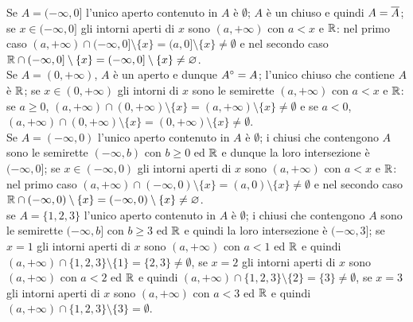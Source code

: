 Se $ A = (-\infty, 0] $ l'unico aperto contenuto in $ A $ è $ \emptyset $; $ A $ è un chiuso e quindi $ A = \overline{A} $; se $ x \in (-\infty, 0] $ gli intorni aperti di $ x $ sono $ (a, +\infty) $ con $ a < x $ e $ \mathbb{R} $: nel primo caso $ (a, +\infty) \cap (-\infty, 0] \setminus \{x\} = (a, 0] \setminus \{x\} \neq \emptyset $ e nel secondo caso $ \mathbb{R} \cap (-\infty, 0] \setminus \{x\} = (-\infty, 0] \setminus \{x\} \neq \varnothing $. \\
Se $ A = (0, +\infty) $, $ A $ è un aperto e dunque $ {A}^{\circ} = A $; l'unico chiuso che contiene $ A $ è $ \mathbb{R} $; se $ x \in (0, +\infty) $ gli intorni di $ x $ sono le semirette $ (a, +\infty) $ con $ a < x $ e $ \mathbb{R} $: se $ a \geq 0 $, $ (a, +\infty) \cap (0, +\infty) \setminus \{x\} = (a, +\infty) \setminus \{x\} \neq \emptyset $ e se $ a < 0 $, $ (a, +\infty) \cap (0, +\infty) \setminus \{x\} = (0, +\infty) \setminus \{x\} \neq \emptyset $. \\
Se $ A = (-\infty, 0) $ l'unico aperto contenuto in $ A $ è $ \emptyset $; i chiusi che contengono $ A $ sono le semirette $ (-\infty, b) $ con $ b \geq 0 $ ed $ \mathbb{R} $ e dunque la loro intersezione è $ (-\infty, 0] $; se $ x \in (-\infty, 0) $ gli intorni aperti di $ x $ sono $ (a, +\infty) $ con $ a < x $ e $ \mathbb{R} $: nel primo caso $ (a, +\infty) \cap (-\infty, 0) \setminus \{x\} = (a, 0) \setminus \{x\} \neq \emptyset $ e nel secondo caso $ \mathbb{R} \cap (-\infty, 0) \setminus \{x\} = (-\infty, 0) \setminus \{x\} \neq \varnothing $. \\
se $ A = \{1, 2, 3\} $ l'unico aperto contenuto in $ A $ è $ \emptyset $; i chiusi che contengono $ A $ sono le semirette $ (-\infty, b] $ con $ b \geq 3 $ ed $ \mathbb{R} $ e quindi la loro intersezione è $ (-\infty, 3] $; se $ x = 1 $ gli intorni aperti di $ x $ sono $ (a, +\infty) $ con $ a < 1 $ ed $ \mathbb{R} $ e quindi $ (a, +\infty) \cap \{1, 2, 3\} \setminus \{1\} = \{2, 3\} \neq \emptyset $, se $ x = 2 $ gli intorni aperti di $ x $ sono $ (a, +\infty) $ con $ a < 2 $ ed $ \mathbb{R} $ e quindi $ (a, +\infty) \cap \{1, 2, 3\} \setminus \{2\} = \{3\} \neq \emptyset $, se $ x = 3 $ gli intorni aperti di $ x $ sono $ (a, +\infty) $ con $ a < 3 $ ed $ \mathbb{R} $ e quindi $ (a, +\infty) \cap \{1, 2, 3\} \setminus \{3\} = \emptyset $.

